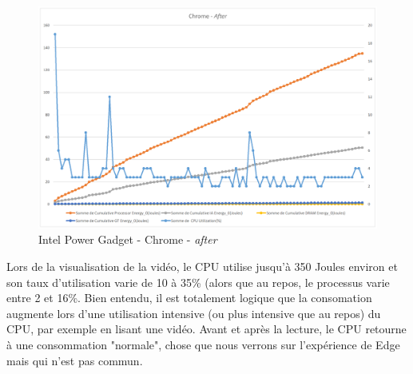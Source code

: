 \documentclass[12pt, a4paper]{report}
\begin{document}
\begin{figure}[H]
    \centering
    \includegraphics[width=1\linewidth]{res//graph/IntelPowerGadget/chrome-after.png}
    \caption{Intel Power Gadget - Chrome - \textit{after}}
    \label{fig:ipg_chrome-after}
\end{figure}
Lors de la visualisation de la vidéo, le CPU utilise jusqu'à 350 Joules environ et son taux d'utilisation varie de 10 à 35\% (alors que au repos, le processus varie entre 2 et 16\%.
Bien entendu, il est totalement logique que la consomation augmente lors d'une utilisation intensive (ou plus intensive que au repos) du CPU, par exemple en lisant une vidéo.
Avant et après la lecture, le CPU retourne à une consommation "normale", chose que nous verrons sur l'expérience de Edge mais qui n'est pas commun.
\end{document}
